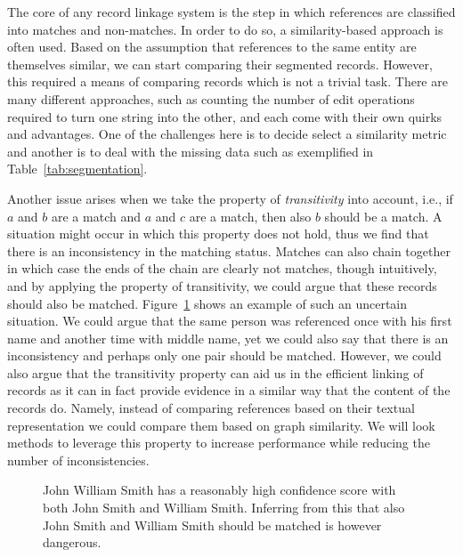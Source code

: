 \documentclass[paper=a4, fontsize=11pt]{scrartcl}
\begin{document}
The core of any record linkage system is the step in which references are classified into matches and non-matches.
In order to do so, a similarity-based approach is often used.
Based on the assumption that references to the same entity are themselves similar, we can start comparing their segmented records.
However, this required a means of comparing records which is not a trivial task.
There are many different approaches, such as counting the number of edit operations required to turn one string into the other, and each come with their own quirks and advantages.
One of the challenges here is to decide select a similarity metric and another is to deal with the missing data such as exemplified in Table~\ref{tab:segmentation}.

Another issue arises when we take the property of \emph{transitivity} into account, i.e., if $a$ and $b$ are a match and $a$ and $c$ are a match, then also $b$ should be a match.
A situation might occur in which this property does not hold, thus we find that there is an inconsistency in the matching status.
Matches can also chain together in which case the ends of the chain are clearly not matches, though intuitively, and by applying the property of transitivity, we could argue that these records should also be matched.
Figure~\ref{fig:transitive_closure} shows an example of such an uncertain situation.
We could argue that the same person was referenced once with his first name and another time with middle name, yet we could also say that there is an inconsistency and perhaps only one pair should be matched.
However, we could also argue that the transitivity property can aid us in the efficient linking of records as it can in fact provide evidence in a similar way that the content of the records do.
Namely, instead of comparing references based on their textual representation we could compare them based on graph similarity.
We will look methods to leverage this property to increase performance while reducing the number of inconsistencies.

\begin{figure}
    \centering
    
    \caption{John William Smith has a reasonably high confidence score with both John Smith and William Smith. Inferring from this that also John Smith and William Smith should be matched is however dangerous.}
    \label{fig:transitive_closure}
\end{figure}
\end{document}
